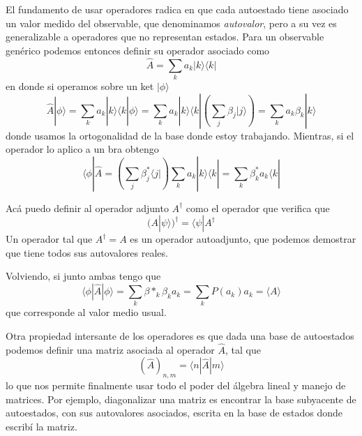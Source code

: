 El fundamento de usar operadores radica en que cada autoestado tiene asociado un valor medido del observable, que denominamos \emph{autovalor}, pero a su vez es generalizable a operadores que no representan estados.
Para un observable genérico podemos entonces definir su operador asociado como
\begin{equation}
    \hat{A} = \sum_k a_k |k \rangle\langle k|
\end{equation}
en donde si operamos sobre un ket $|\phi \rangle$
\begin{equation}
    \hat{A} |\phi\rangle = \sum_k a_k |k \rangle \langle k | \phi \rangle = \sum_k a_k |k \rangle \langle k | \left(\sum_j \beta_j |j \rangle\right) = \sum_k a_k \beta_k |k \rangle
\end{equation}
donde usamos la ortogonalidad de la base donde estoy trabajando.
Mientras, si el operador lo aplico a un bra obtengo
\begin{equation}
    \langle \phi | \hat{A} = \left(\sum_j \beta^{*}_j \langle j |\right) \sum_k a_k | k \rangle \langle k | = \sum_k \beta^{*}_k a_k \langle k |
\end{equation}

Acá puedo definir al operador adjunto $A^\dagger$ como el operador que verifica que
\begin{equation}
    (A |\psi \rangle)^\dagger = \langle \psi | A^\dagger
\end{equation}
Un operador tal que $A^\dagger = A$ es un operador autoadjunto, que podemos demostrar que tiene todos sus autovalores reales.

Volviendo, si junto ambas tengo que
\begin{equation}
    \langle \phi | \hat{A} | \phi \rangle = \sum_k \beta*_k \beta_k a_k = \sum_k P(a_k) a_k = \langle A \rangle
\end{equation}
que corresponde al valor medio usual.

Otra propiedad intersante de los operadores es que dada una base de autoestados podemos definir una matriz asociada al operador $\hat{A}$, tal que
\begin{equation}
    (\hat{A})_{n,m} = \langle n | \hat{A} | m \rangle
\end{equation}
lo que nos permite finalmente usar todo el poder del álgebra lineal y manejo de matrices.
Por ejemplo, diagonalizar una matriz es encontrar la base subyacente de autoestados, con sus autovalores asociados, escrita en la base de estados donde escribí la matriz.


